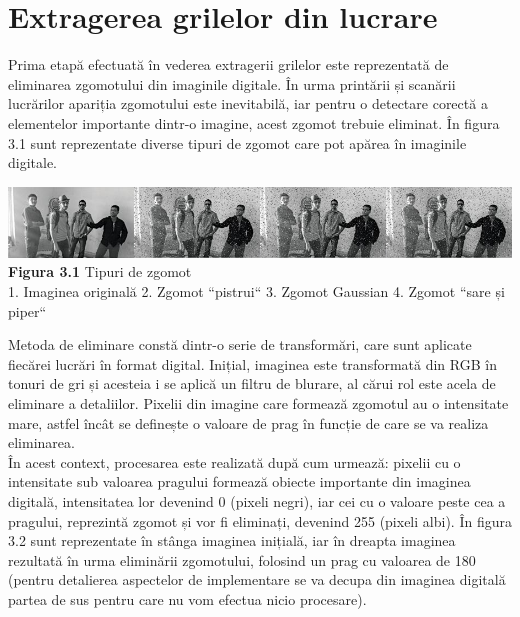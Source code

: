 \documentclass[a4paper,12pt]{report}
\newcommand\tab[1][1cm]{\hspace*{#1}}
\begin{document}
\section{Extragerea grilelor din lucrare}
\tab Prima etapă efectuată în vederea extragerii grilelor este reprezentată de eliminarea zgomotului din imaginile digitale. În urma printării și scanării lucrărilor apariția zgomotului este inevitabilă, iar pentru o detectare corectă a elementelor importante dintr-o imagine, acest zgomot trebuie eliminat. În figura 3.1 sunt reprezentate diverse tipuri de zgomot care pot apărea în imaginile digitale.
\begin {center} 
	\begin {footnotesize} 
		\includegraphics[width = 160mm]{fig3_1} \\
		\textbf  {Figura 3.1} Tipuri de zgomot \\ 1. Imaginea originală \hspace{11mm} 2. Zgomot ``pistrui``  \hspace{10mm} 3. Zgomot Gaussian \hspace{10mm} 4. Zgomot ``sare și piper``
	\end {footnotesize} 
\end {center}
\tab Metoda de eliminare constă dintr-o serie de transformări, care sunt aplicate fiecărei lucrări în format digital. Inițial, imaginea este transformată din RGB în tonuri de gri și acesteia i se aplică un filtru de blurare, al cărui rol este acela de eliminare a detaliilor. Pixelii din imagine care formează zgomotul au o intensitate mare, astfel încât se definește o valoare de prag în funcție de care se va realiza eliminarea.
\\ \tab În acest context, procesarea este realizată după cum urmează: pixelii cu o intensitate sub valoarea pragului formează obiecte importante din imaginea digitală, intensitatea lor devenind 0 (pixeli negri), iar cei cu o valoare peste cea a pragului, reprezintă zgomot și vor fi eliminați, devenind 255 (pixeli albi). În figura 3.2 sunt reprezentate în stânga imaginea inițială, iar în dreapta imaginea rezultată în urma eliminării zgomotului, folosind un prag cu valoarea de 180 (pentru detalierea aspectelor de implementare se va decupa din imaginea digitală partea de sus pentru care nu vom efectua nicio procesare).
\end{document}
